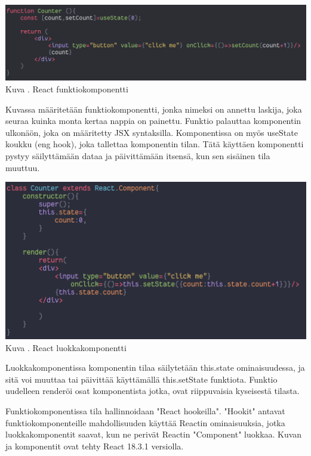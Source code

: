 \bigskip
\includegraphics[width=15cm]{src/public/oppar/function_component.png}\\
Kuva \getImgCount{}. React funktiokomponentti
\medskip

Kuvassa \theimgCounter{} määritetään funktiokomponentti, jonka nimeksi on annettu laskija, joka seuraa kuinka monta kertaa nappia on painettu.
Funktio palauttaa komponentin ulkonäön, joka on määritetty JSX syntaksilla.
Komponentissa on myös useState koukku (eng hook), joka tallettaa komponentin tilan.
Tätä käyttäen komponentti pystyy säilyttämään dataa ja päivittämään itsensä, kun sen sisäinen tila muuttuu.
\medskip




\bigskip
\includegraphics[width=15cm]{src/public/oppar/class_.png}\\
Kuva \getImgCount{}. React luokkakomponentti
\medskip



Luokkakomponentissa komponentin tilaa säilytetään this.state ominaisuudessa, ja sitä voi muuttaa tai päivittää käyttämällä this.setState funktiota. 
Funktio uudelleen renderöi osat komponentista jotka, ovat riippuvaisia kyseisestä tilasta.
\medskip


Funktiokomponentissa tila hallinnoidaan "React hookeilla"{}. 
"Hookit"{} antavat funktiokomponenteille mahdollisuuden käyttää Reactin ominaisuuksia, 
jotka luokkakomponentit saavat, kun ne perivät Reactin "Component"{} luokkaa.
Kuvan \prevImageCount{} ja \theimgCounter{} komponentit ovat tehty React 18.3.1 versiolla.
\medskip



